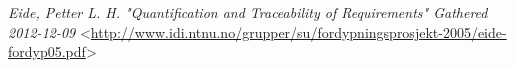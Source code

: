 \begin{thebibliography}{99}     
	

 \emph{Eide, Petter L. H. \textsl{"Quantiﬁcation and Traceability of Requirements"} Gathered 2012-12-09 } <\url{http://www.idi.ntnu.no/grupper/su/fordypningsprosjekt-2005/eide-fordyp05.pdf}>


\end{thebibliography}